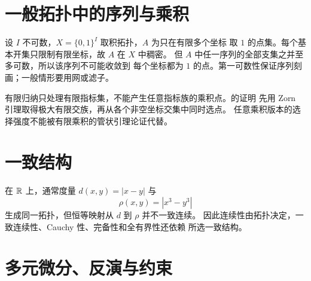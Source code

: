 \section{一般拓扑中的序列与乘积}

\begin{description}[style=nextline,leftmargin=3em]
 \item[错误命题：一般拓扑空间的闭包都可由数列刻画。]
 设 \(I\) 不可数，\(X=\{0,1\}^I\) 取积拓扑，\(A\) 为只在有限多个坐标
 取 \(1\) 的点集。每个基本开集只限制有限坐标，故 \(A\) 在 \(X\) 中稠密。
 但 \(A\) 中任一序列的全部支集之并至多可数，所以该序列不可能收敛到
 每个坐标都为 \(1\) 的点。第一可数性保证序列刻画；一般情形要用网或滤子。

 \item[错误命题：有限乘积紧致性的归纳证明也证明任意乘积紧致。]
 有限归纳只处理有限指标集，不能产生任意指标族的乘积点。的证明
 先用 Zorn 引理取得极大有限交族，再从各个非空坐标交集中同时选点。
 任意乘积版本的选择强度不能被有限乘积的管状引理论证代替。
\end{description}

\section{一致结构}

\begin{description}[style=nextline,leftmargin=3em]
 \item[错误命题：同一拓扑只对应一个一致结构。]
 在 \(\mathbb{R}\) 上，通常度量 \(d(x,y)=|x-y|\) 与
 \[
  \rho(x,y)=|x^3-y^3|
 \]
 生成同一拓扑，但恒等映射从 \(d\) 到 \(\rho\) 并不一致连续。
 因此连续性由拓扑决定，一致连续性、Cauchy 性、完备性和全有界性还依赖
 所选一致结构。

\end{description}

\section{多元微分、反演与约束}

